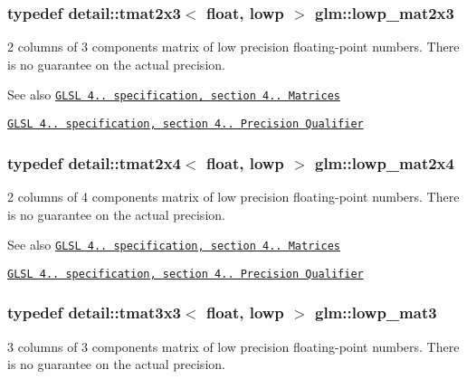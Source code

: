 \subsubsection[{\texorpdfstring{lowp\+\_\+mat2x3}{lowp_mat2x3}}]{\setlength{\rightskip}{0pt plus 5cm}typedef detail\+::tmat2x3$<$ float, lowp $>$ {\bf glm\+::lowp\+\_\+mat2x3}}\hypertarget{group__core__precision_gaef481e637af5103a83ab561d30d28f2a}{}\label{group__core__precision_gaef481e637af5103a83ab561d30d28f2a}
2 columns of 3 components matrix of low precision floating-\/point numbers. There is no guarantee on the actual precision.

\begin{DoxySeeAlso}{See also}
\href{http://www.opengl.org/registry/doc/GLSLangSpec.4.20.8.pdf}{\tt G\+L\+SL 4.. specification, section 4.. Matrices} 

\href{http://www.opengl.org/registry/doc/GLSLangSpec.4.20.8.pdf}{\tt G\+L\+SL 4.. specification, section 4.. Precision Qualifier} 
\end{DoxySeeAlso}
\subsubsection[{\texorpdfstring{lowp\+\_\+mat2x4}{lowp_mat2x4}}]{\setlength{\rightskip}{0pt plus 5cm}typedef detail\+::tmat2x4$<$ float, lowp $>$ {\bf glm\+::lowp\+\_\+mat2x4}}\hypertarget{group__core__precision_gaa62e33ee2864909c8522a549fbf40ce5}{}\label{group__core__precision_gaa62e33ee2864909c8522a549fbf40ce5}
2 columns of 4 components matrix of low precision floating-\/point numbers. There is no guarantee on the actual precision.

\begin{DoxySeeAlso}{See also}
\href{http://www.opengl.org/registry/doc/GLSLangSpec.4.20.8.pdf}{\tt G\+L\+SL 4.. specification, section 4.. Matrices} 

\href{http://www.opengl.org/registry/doc/GLSLangSpec.4.20.8.pdf}{\tt G\+L\+SL 4.. specification, section 4.. Precision Qualifier} 
\end{DoxySeeAlso}
\subsubsection[{\texorpdfstring{lowp\+\_\+mat3}{lowp_mat3}}]{\setlength{\rightskip}{0pt plus 5cm}typedef detail\+::tmat3x3$<$ float, lowp $>$ {\bf glm\+::lowp\+\_\+mat3}}\hypertarget{group__core__precision_gaae2935658c6a3668ac1935a7f6064d51}{}\label{group__core__precision_gaae2935658c6a3668ac1935a7f6064d51}
3 columns of 3 components matrix of low precision floating-\/point numbers. There is no guarantee on the actual precision.

